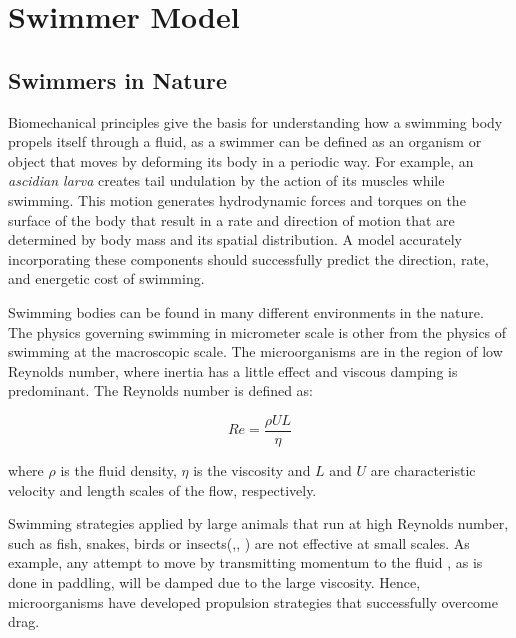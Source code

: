 

\chapter{Swimmer Model}
\label{chap:chapter_2}

\section{Swimmers in Nature}
\label{sec:section_1}


Biomechanical principles give the basis for understanding how a swimming body propels itself through a fluid\cite{mchenry_morphology_2005}, as a swimmer can be defined as
an organism or object that moves by deforming its body in a periodic way. For example, an \textit{ascidian larva} creates
\cite{sawada_biology_2001} tail undulation by the action of its muscles while swimming. This motion generates hydrodynamic forces and torques on the surface of the body that result in a rate and direction
of motion that are determined by body mass and its spatial distribution. A model accurately incorporating these components should successfully predict the direction, rate, and 
energetic cost of swimming.\par
Swimming bodies can be found in many different environments in the nature. The physics governing swimming in micrometer scale is other from the physics of swimming at the macroscopic
scale. The microorganisms are in the region of low Reynolds number, where inertia has a little effect and viscous damping is predominant. The Reynolds number is defined as:

\begin{equation}\label{re} 
  Re = \frac {\rho UL}{\eta}
\end{equation}

where $\rho$ is the fluid density, $\eta$ is the viscosity and $L$ and $U$ are characteristic velocity and length scales of the flow, respectively.\par

Swimming strategies applied by large animals that run at high Reynolds number, such as fish, snakes, birds or insects(\cite{childress_mechanics_1981},\cite{vogel_life_1996},
\cite{digest_natures}) are not effective at small scales. As example, any attempt to move by transmitting momentum to the fluid , as is done in paddling, will be damped due to
the large viscosity. Hence, microorganisms have developed propulsion strategies that successfully overcome drag.



